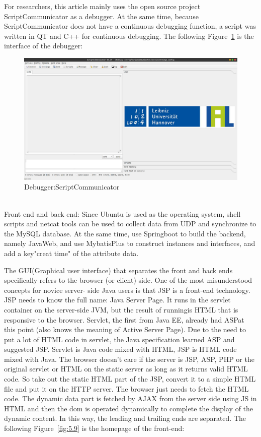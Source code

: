 For researchers, this article mainly uses the open source project ScriptCommunicator as a debugger. At the same time, because ScriptCommunicator does not have a continuous debugging function, a script was written in QT and C++ for continuous debugging.
The following Figure~\ref{fig:5.8} is the interface of the debugger:

\begin{figure}[!ht]
	\centering
	\includegraphics[width=16cm]{grafiken/5.8.pdf}
	\caption{Debugger:ScriptCommunicator} 
	\label{fig:5.8}
\end{figure}
\FloatBarrier
\\
Front end and back end:
Since Ubuntu is used as the operating system, shell scripts and netcat tools can be used to collect data from UDP and synchronize to the MySQL database. At the same time, use Springboot to build the backend, namely JavaWeb, and use MybatisPlus to construct instances and interfaces, and add a key"creat time" of the attribute data.


The GUI(Graphical user interface) that separates the front and back ends specifically refers to the browser (or client) side. One of the most misunderstood concepts for novice server-
side Java users is that JSP is a front-end technology. JSP needs to know the full name: Java Server Page. It runs in the servlet container on the server-side JVM, but the result of runningis HTML that is responsive to the browser. Servlet, the first from Java EE, already had ASPat this point (also knows the meaning of Active Server Page). Due to the need to put a lot of HTML code in servlet, the Java specification learned ASP and suggested JSP. Servlet is Java code mixed with HTML, JSP is HTML code mixed with Java. The browser doesn’t care if the server is JSP, ASP, PHP or the original servlet or HTML on the static server as long as it returns valid HTML code. So take out the static HTML part of the JSP, convert it to a simple
HTML file and put it on the HTTP server. The browser just needs to fetch the HTML code. The dynamic data part is fetched by AJAX from the server side using JS in HTML and then the dom is operated dynamically to complete the display of the dynamic content. In this way, the leading and trailing ends are separated.
The following Figure~\ref{fig:5.9}  is the homepage of the front-end:



